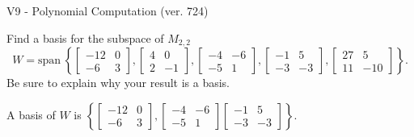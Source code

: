 \begin{exercise}
  \begin{exerciseTitle}V9 - Polynomial Computation (ver. 724)\end{exerciseTitle}
  \begin{exerciseStatement}
    Find a basis for the subspace of \(M_{2,2}\) 
\[W=\mathrm{span}\ \left\{\left[\begin{array}{cc}
-12 & 0 \\
-6 & 3
\end{array}\right] , \left[\begin{array}{cc}
4 & 0 \\
2 & -1
\end{array}\right] , \left[\begin{array}{cc}
-4 & -6 \\
-5 & 1
\end{array}\right] , \left[\begin{array}{cc}
-1 & 5 \\
-3 & -3
\end{array}\right] , \left[\begin{array}{cc}
27 & 5 \\
11 & -10
\end{array}\right]\right\}.\]
 Be sure to explain why your result is a basis.


  \end{exerciseStatement}
  \begin{exerciseAnswer}
   A basis of \(W\) is  \(\left\{\left[\begin{array}{cc}
-12 & 0 \\
-6 & 3
\end{array}\right] , \left[\begin{array}{cc}
-4 & -6 \\
-5 & 1
\end{array}\right] \left[\begin{array}{cc}
-1 & 5 \\
-3 & -3
\end{array}\right]\right\}\).
  


  \end{exerciseAnswer}
\end{exercise}